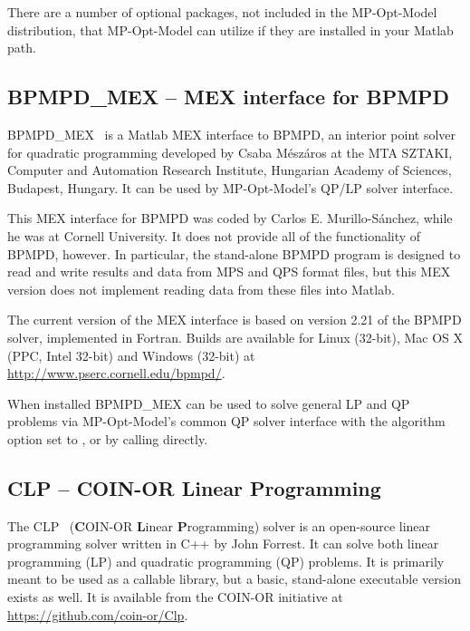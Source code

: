 \documentclass[12pt]{article}
\newcommand{\matlab}[0]{{\sc Matlab}}
\newcommand{\mpom}[0]{\mbox{MP-Opt-Model}}
\newcommand{\clp}[0]{{CLP}}
\newcommand{\code}[1]{{\relsize{-0.5}{\tt{{#1}}}}}  %
\newcommand{\codeq}[1]{\code{\textquotesingle{}#1\textquotesingle}}  %
\numberwithin{equation}{section}
\numberwithin{table}{section}
\numberwithin{figure}{section}
\begin{document}
\begin{appendices}
There are a number of optional packages, not included in the \mpom{} distribution, that \mpom{} can utilize if they are installed in your \matlab{} path.

\subsection{BPMPD\_MEX -- MEX interface for BPMPD}
\label{app:bpmpd}

BPMPD\_MEX~\cite{bpmpdmex,meszaros1996} is a \matlab{} MEX interface to BPMPD, an interior point solver for quadratic programming developed by Csaba M{\'e}sz{\'a}ros at the MTA SZTAKI, Computer and Automation Research Institute, Hungarian Academy of Sciences, Budapest, Hungary. It can be used by \mpom{}'s QP/LP solver interface.

This MEX interface for BPMPD was coded by Carlos E. Murillo-S{\'a}nchez, while he was at Cornell University. It does not provide all of the functionality of BPMPD, however. In particular, the stand-alone BPMPD program is designed to read and write results and data from MPS and QPS format files, but this MEX version does not implement reading data from these files into \matlab{}.

The current version of the MEX interface is based on version 2.21 of the BPMPD solver, implemented in Fortran. Builds are available for Linux (32-bit), Mac OS X (PPC, Intel 32-bit) and Windows (32-bit) at \url{http://www.pserc.cornell.edu/bpmpd/}.

When installed BPMPD\_MEX can be used to solve general LP and QP problems via \mpom{}'s common QP solver interface \code{qps\_master} with the algorithm option set to \codeq{BPMPD}, or by calling \code{qps\_bpmpd} directly.

\subsection{\clp{} -- COIN-OR Linear Programming}
\label{app:clp}

The \clp{}~\cite{clp} ({\bf C}OIN-OR {\bf L}inear {\bf P}rogramming) solver is an open-source linear programming solver written in C++ by John Forrest. It can solve both linear programming (LP) and quadratic programming (QP) problems. It is primarily meant to be used as a callable library, but a basic, stand-alone executable version exists as well. It is available from the COIN-OR initiative at \url{https://github.com/coin-or/Clp}.


\end{appendices}
\end{document}
